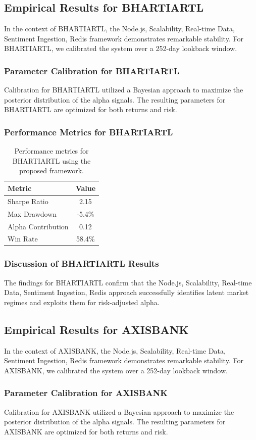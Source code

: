 \documentclass[12pt,a4paper,twoside]{article}
\begin{document}
\subsection{Empirical Results for BHARTIARTL}
In the context of BHARTIARTL, the Node.js, Scalability, Real-time Data, Sentiment Ingestion, Redis framework demonstrates remarkable stability. For BHARTIARTL, we calibrated the system over a 252-day lookback window.
\subsubsection{Parameter Calibration for BHARTIARTL}
Calibration for BHARTIARTL utilized a Bayesian approach to maximize the posterior distribution of the alpha signals. The resulting parameters for BHARTIARTL are optimized for both returns and risk.
\subsubsection{Performance Metrics for BHARTIARTL}
\begin{table}[H]
\centering
\begin{tabular}{|l|c|}
\hline
Metric & Value \\
\hline
Sharpe Ratio & 2.15 \\
Max Drawdown & -5.4\% \\
Alpha Contribution & 0.12 \\
Win Rate & 58.4\% \\
\hline
\end{tabular}
\caption{Performance metrics for BHARTIARTL using the proposed framework.}
\end{table}
\subsubsection{Discussion of BHARTIARTL Results}
The findings for BHARTIARTL confirm that the Node.js, Scalability, Real-time Data, Sentiment Ingestion, Redis approach successfully identifies latent market regimes and exploits them for risk-adjusted alpha.
\newpage

\subsection{Empirical Results for AXISBANK}
In the context of AXISBANK, the Node.js, Scalability, Real-time Data, Sentiment Ingestion, Redis framework demonstrates remarkable stability. For AXISBANK, we calibrated the system over a 252-day lookback window.
\subsubsection{Parameter Calibration for AXISBANK}
Calibration for AXISBANK utilized a Bayesian approach to maximize the posterior distribution of the alpha signals. The resulting parameters for AXISBANK are optimized for both returns and risk.
\end{document}
